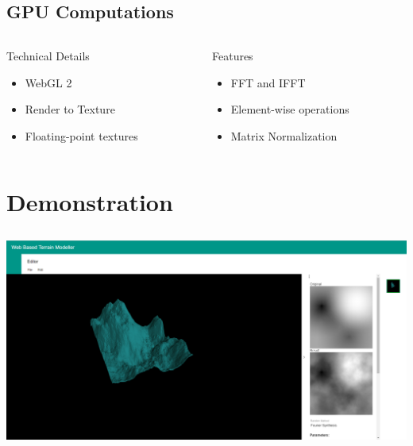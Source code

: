 \documentclass[aspectratio=169]{beamer}
\let\oldsection\section
\renewcommand{\section}[1]{
	\oldsection{#1}	
	\subsection{}
}
\newenvironment{myframe}[1][t]{\begin{frame}[#1]{\secname}{\subsecname}}{\end{frame}}
\begin{document}
	\subsection{GPU Computations}
	
	\begin{myframe}
		\begin{columns}[T]
			\begin{column}{0.47\textwidth}
				\begin{block}{Technical Details}
					\begin{itemize}
						\item WebGL 2
						\item Render to Texture
						\item Floating-point textures
					\end{itemize}
				\end{block}
			\end{column}		
			\begin{column}{0.47\textwidth}
				\begin{block}{Features}
					
					\begin{itemize}
						\item FFT and IFFT
						\item Element-wise operations
						\item Matrix Normalization
					\end{itemize}
				\end{block}
			\end{column}	
		\end{columns}
	\end{myframe}
	
	\section{Demonstration}
	
	\begin{myframe}
		\vspace{-0.75cm}
		\centering
		\includegraphics[width=0.9\linewidth]{images/results/demonstration}
	\end{myframe}
	
\end{document}
